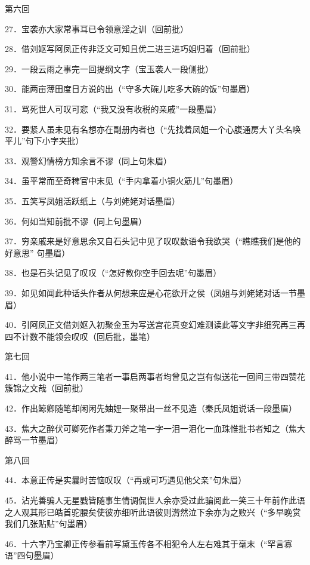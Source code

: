 第六回

27．宝袭亦大家常事耳已令领意淫之训{（\kaishu 回前批）}

28．借刘妪写阿凤正传非泛文可知且优二进三进巧姐归着{（\kaishu 回前批）}

29．一段云雨之事完一回提纲文字{（\kaishu 宝玉袭人一段侧批）}

30．能两亩薄田度日方说的出{（\kaishu ``守多大碗儿吃多大碗的饭''句墨眉）}

31．骂死世人可叹可悲{（\kaishu ``我又没有收税的亲戚''一段墨眉）}

32．要紧人虽未见有名想亦在副册内者也{（\kaishu ``先找着凤姐一个心腹通房大丫头名唤平儿''句下小字夹批）}

33．观警幻情榜方知余言不谬{（\kaishu 同上句朱眉）}

34．虽平常而至奇稗官中末见{（\kaishu ``手内拿着小铜火筋儿''句墨眉）}

35．五笑写凤姐活跃纸上{（\kaishu 与刘姥姥对话墨眉）}

36．何如当知前批不谬{（\kaishu 同上句墨眉）}

37．穷亲戚来是好意思余又自石头记中见了叹叹数语令我欲哭{（\kaishu ``瞧瞧我们是他的好意思''
句墨眉）}

38．也是石头记见了叹叹{（\kaishu ``怎好教你空手回去呢''句墨眉）}

39．如见如闻此种话头作者从何想来应是心花欲开之侯{（\kaishu 凤姐与刘姥姥对话一节墨眉）}

40．引阿凤正文借刘妪入初聚金玉为写送宫花真变幻难测读此等文字非细究再三再四不计数不能领会叹叹{（\kaishu 回后批，墨笔）}

第七回

41．他小说中一笔作两三笔者一事启两事者均曾见之岂有似送花一回间三带四赞花簇锦之文哉{（\kaishu 回前批）}

42．作出鲸卿随笔却闲闲先妯娌一聚带出一丝不见造{（\kaishu 秦氏凤姐说话一段墨眉）}

43．焦大之醉伏可卿死作者秉刀斧之笔一字一泪一泪化一血珠惟批书者知之{（\kaishu 焦大醉骂一节墨眉）}

第八回

44．本意正传是实曩时苦恼叹叹{（\kaishu ``再或可巧遇见他父亲''句朱眉）}

45．沾光善骗人无星戥皆随事生情调侃世人余亦受过此骗阅此一笑三十年前作此语之人观其形已皓首驼腰矣使彼亦细听此语彼则潸然泣下余亦为之败兴{（\kaishu ``多早晚赏我们几张贴贴''句墨眉）}

46．十六字乃宝卿正传参看前写黛玉传各不相犯令人左右难其于毫末{（\kaishu ``罕言寡语''四句墨眉）}

